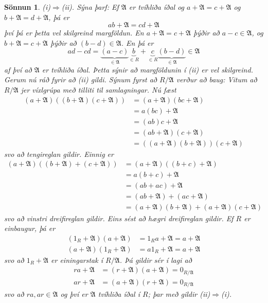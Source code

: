 \documentclass[a4paper,icelandic,11pt]{book}
\theoremstyle{plain}
\newtheorem*{sonnun}{Sönnun}
\begin{document}
\begin{sonnun}
  (i)$\Rightarrow$(ii). Sýna þarf: Ef $\mathfrak A$ er tvíhliða íðal og
  $a + \mathfrak A = c + \mathfrak A$ og $b + \mathfrak A = d + \mathfrak A$, þá
  er \[
  ab + \mathfrak A = cd + \mathfrak A
  \]
  því þá er þetta vel skilgreind margföldun. En $a + \mathfrak A = c + \mathfrak
  A$ þýðir að $a - c \in\mathfrak A$, og $b + \mathfrak A = c + \mathfrak A$
  þýðir að $(b-d)\in \mathfrak A$. En þá er\[
  ad - cd 
  = \underbrace{(a-c)}_{\in \mathfrak A}\underbrace{b}_{\in R}
  + \underbrace{c}_{\in R}\underbrace{(b-d)}_{\in\mathfrak A}
  \in \mathfrak A
  \]
  af því að $\mathfrak A$ er \emph{tvíhliða íðal}. Þetta sýnir að margföldunin í
  (ii) er vel skilgreind. Gerum nú ráð fyrir að (ii) gildi. Sýnum fyrst að
  $R/\mathfrak A$ verður að baug: Vitum að $R/\mathfrak A$ jer víxlgrúpa með
  tilliti til samlagningar. Nú fæst
  \begin{align*}
    (a+\mathfrak A)( (b+\mathfrak A)(c+ \mathfrak A))
    &= (a+\mathfrak A)(bc+\mathfrak A)
    \\
    &= a(bc) + \mathfrak A
    \\
    &= (ab)c + \mathfrak A
    \\
    &= (ab + \mathfrak A)(c+\mathfrak A)
    \\
    &= ( (a+\mathfrak A)(b+\mathfrak A))(c+\mathfrak A)
  \end{align*}
  svo að tengireglan gildir. Einnig er
  \begin{align*}
    (a+\mathfrak A)( (b + \mathfrak A)+(c+\mathfrak A))
    &= (a+\mathfrak A)( (b+c)+\mathfrak A)
    \\
    &= a(b+c)+\mathfrak A
    \\
    &= (ab + ac) + \mathfrak A
    \\
    &= (ab + \mathfrak A) + (ac + \mathfrak A)
    \\
    &= (a+\mathfrak A)(b + \mathfrak A) + (a+\mathfrak A)(c + \mathfrak A)
  \end{align*}
  svo að vinstri dreifireglan gildir. Eins sést að hægri dreifireglan gildir. Ef
  $R$ er einbaugur, þá er
  \begin{align*}
    (1_R +\mathfrak A)(a+\mathfrak A) 
    &= 1_Ra + \mathfrak A = a +\mathfrak A
    \\
    (a+\mathfrak A)(1_R + \mathfrak A)
    &= a1_R + \mathfrak A = a +\mathfrak A
  \end{align*}
  svo að $1_R + \mathfrak A$ er einingarstak í $R/\mathfrak A$. Þá gildir sér í
  lagi að
  \begin{align*}
    ra + \mathfrak A 
    &= (r + \mathfrak A)(a + \mathfrak A) = 0_{R/\mathfrak A}
    \\
    ar + \mathfrak A
    &= (a + \mathfrak A)(r + \mathfrak A) = 0_{R/\mathfrak A}
  \end{align*}
  svo að $ra,ar\in\mathfrak A$ og því er $\mathfrak A$ tvíhliða íðal í
  $R$; þar með gildir (ii)$\Rightarrow$(i).
\end{sonnun}
\end{document}

